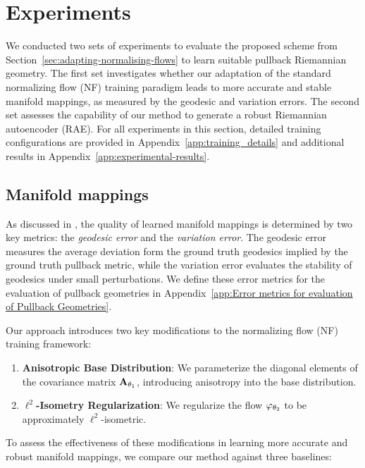 \section{Experiments}
\label{sec:numerics}

We conducted two sets of experiments to evaluate the proposed scheme from Section~\ref{sec:adapting-normalising-flows} to learn suitable pullback Riemannian geometry. The first set investigates whether our adaptation of the standard normalizing flow (NF) training paradigm leads to more accurate and stable manifold mappings, as measured by the geodesic and variation errors. The second set assesses the capability of our method to generate a robust Riemannian autoencoder (RAE). For all experiments in this section, detailed training configurations are provided in Appendix~\ref{app:training_details} and additional results in Appendix~\ref{app:experimental-results}.

\subsection{Manifold mappings}
\label{sec:manifold-mappings-experiments}

As discussed in \cite{diepeveen2024pulling}, the quality of learned manifold mappings is determined by two key metrics: the \emph{geodesic error} and the \emph{variation error}. The geodesic error measures the average deviation form the ground truth geodesics implied by the ground truth pullback metric, while the variation error evaluates the stability of geodesics under small perturbations. We define these error metrics for the evaluation of pullback geometries in Appendix~\ref{app:Error metrics for evaluation of Pullback Geometries}.

Our approach introduces two key modifications to the normalizing flow (NF) training framework:

\begin{enumerate}
    \item \textbf{Anisotropic Base Distribution}: We parameterize the diagonal elements of the covariance matrix \(\mathbf{A}_{\theta_1}\), introducing anisotropy into the base distribution.
    
    \item \textbf{\(\ell^2\)-Isometry Regularization}: We regularize the flow \(\varphi_{\theta_2}\) to be approximately \(\ell^2\)-isometric.
\end{enumerate}

To assess the effectiveness of these modifications in learning more accurate and robust manifold mappings, we compare our method against three baselines:

